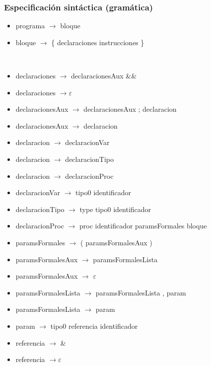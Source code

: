 \documentclass[11pt]{article}
\begin{document}
        \subsubsection{Especificación sintáctica (gramática)}
        \begin{itemize}
            \item programa $\rightarrow$ bloque
            \item bloque $\rightarrow$ \{ declaraciones instrucciones \}
        \end{itemize}
        \
        \begin{itemize}
            \item declaraciones $\rightarrow$ declaracionesAux \&\&
            \item declaraciones $\rightarrow \varepsilon$
            \item declaracionesAux $\rightarrow$ declaracionesAux ; declaracion
            \item declaracionesAux $\rightarrow$ declaracion
            \item declaracion $\rightarrow$ declaracionVar
            \item declaracion $\rightarrow$ declaracionTipo
            \item declaracion $\rightarrow$ declaracionProc
            \item declaracionVar $\rightarrow$ tipo0 identificador
            \item declaracionTipo $\rightarrow$ type tipo0 identificador
            \item declaracionProc $\rightarrow$ proc identificador paramsFormales bloque
            \item paramsFormales $\rightarrow$ ( paramsFormalesAux )
            \item paramsFormalesAux $\rightarrow$ paramsFormalesLista
            \item paramsFormalesAux $\rightarrow$ $\varepsilon$
            \item paramsFormalesLista $\rightarrow$ paramsFormalesLista , param 
            \item paramsFormalesLista $\rightarrow$ param
            \item param $\rightarrow$ tipo0 referencia identificador
            \item referencia $\rightarrow$ \&
            \item referencia $\rightarrow \varepsilon$
        \end{itemize}
        \
\end{document}
